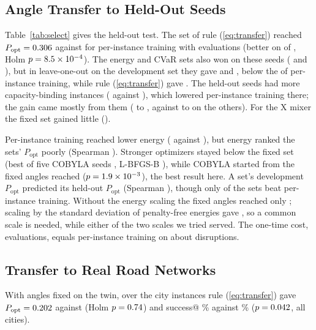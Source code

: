 \documentclass[conference]{IEEEtran}
\begin{document}
\subsection{Angle Transfer to Held-Out Seeds}

Table~\ref{tab:select} gives the held-out test. The set of rule (\ref{eq:transfer}) reached $P_{\mathrm{opt}}=0.306$ against \SelTrained{} for per-instance training with \HoCumFour{} evaluations (better on \SelPoptWins{} of \HoN, Holm $p=8.5\times10^{-4}$). The energy and CVaR sets also won on these seeds (\SelEn{} and \SelCv), but in leave-one-out on the development set they gave \SelEnLoo{} and \SelCvLoo, below the \SelDevTrained{} of per-instance training, while rule (\ref{eq:transfer}) gave \SelPoptLoo. The held-out seeds had more capacity-binding instances (\HoNBind{} against \NBinding), which lowered per-instance training there; the gain came mostly from them (\HoBindTrained{} to \HoBindFixed, against \HoNonBindTrained{} to \HoNonBindFixed{} on the others). For the X mixer the fixed set gained little (\SelXPopt).

Per-instance training reached lower energy (\EnTrained{} against \EnFixed), but energy ranked the \CandN{} sets' $P_{\mathrm{opt}}$ poorly (Spearman \RhoEnPopt). Stronger optimizers stayed below the fixed set (best of five COBYLA seeds \SelBestFive, L-BFGS-B \SelLbfgs), while COBYLA started from the fixed angles reached \StrWarm{} ($p=1.9\times10^{-3}$), the best result here. A set's development $P_{\mathrm{opt}}$ predicted its held-out $P_{\mathrm{opt}}$ (Spearman \RhoDevHeld), though only \CandBeat{} of the \CandN{} sets beat per-instance training. Without the energy scaling the fixed angles reached only \NormNoneFixed; scaling by the standard deviation of penalty-free energies gave \NormStdFixed, so a common scale is needed, while either of the two scales we tried served. The one-time cost, \OffTotal{} evaluations, equals per-instance training on about \OffBreakEven{} disruptions.

\subsection{Transfer to Real Road Networks}
With angles fixed on the twin, over the \CityN{} city instances rule (\ref{eq:transfer}) gave $P_{\mathrm{opt}}=0.202$ against \CityTrained{} (Holm $p=0.74$) and success@\Shots{} \CitySuccFixed\% against \CitySuccTrained\% ($p=0.042$, all \CitySuccPos{} cities).
\end{document}
